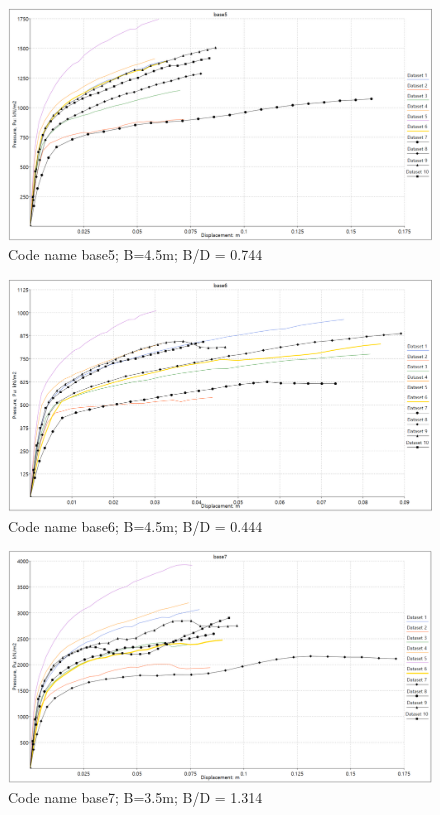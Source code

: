 \documentclass[a4paper, nobind]{templates/ociamthesis}
\begin{document}
\begin{figure}[H]
\includegraphics[width=1\linewidth]{myfigureeeeee/BASE5} \caption{Code name base5; B=4.5m; B/D = 0.744}\label{fig:unnamed-chunk-41}
\end{figure}

\begin{figure}[H]
\includegraphics[width=1\linewidth]{myfigureeeeee/BASE6} \caption{Code name base6; B=4.5m; B/D = 0.444}\label{fig:unnamed-chunk-42}
\end{figure}

\begin{figure}[H]
\includegraphics[width=1\linewidth]{myfigureeeeee/BASE7} \caption{Code name base7; B=3.5m; B/D = 1.314}\label{fig:unnamed-chunk-43}
\end{figure}
\end{document}
